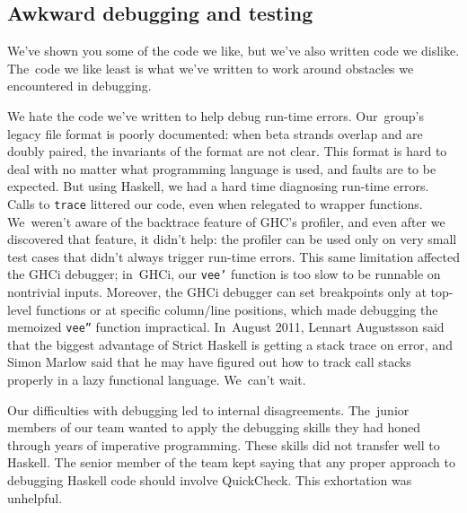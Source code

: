 \documentclass[preprint,nonatbib,blockstyle,times]{sigplanconf}
\newcommand\seclabel[1]{\label{sec:#1}}
\begin{document}
\subsection{Awkward debugging and testing}

\seclabel{awkward-profiling}

We've shown you some of the code we like, but we've also written 
code we dislike.
The~code we like least is what we've written to work around
obstacles we 
encountered in debugging.

We hate the code we've written to help debug
run-time errors.
Our~group's legacy file
format is poorly documented: when beta
strands overlap and are doubly paired, the invariants of the
format are not clear.
This format is hard to deal with no matter what
programming language is used, and faults are to be expected.
But using Haskell, we had a hard time diagnosing run-time errors.
Calls to
\texttt{trace} 
littered our code,
even when relegated to wrapper functions.
We~weren't aware of the backtrace feature of GHC's profiler,
and even after we discovered that feature, it didn't help:
the profiler can be used only on very small test cases that didn't always trigger
run-time errors.
This same limitation affected the GHCi debugger; 
in~GHCi, our \texttt{vee'} function
is too slow to be runnable on nontrivial
inputs.
Moreover, the GHCi debugger can set breakpoints only at top-level functions
or at specific column/line positions, which made debugging the memoized
\texttt{vee''} function impractical.
In~August 2011, 
Lennart Augustsson said that the biggest advantage of Strict
Haskell is getting a stack trace on error,
and Simon Marlow said that he may have figured out how to track call
stacks properly in a lazy functional language.
We~can't wait.

Our difficulties with debugging led to internal disagreements.
The~junior members of our team wanted to apply the debugging
skills they had honed through years of imperative programming.
These skills did not transfer well to Haskell.
The senior member of the team kept saying that any proper approach to
debugging Haskell code should involve QuickCheck.
This exhortation was unhelpful.

\seclabel{awkward-quickcheck}
\end{document}
